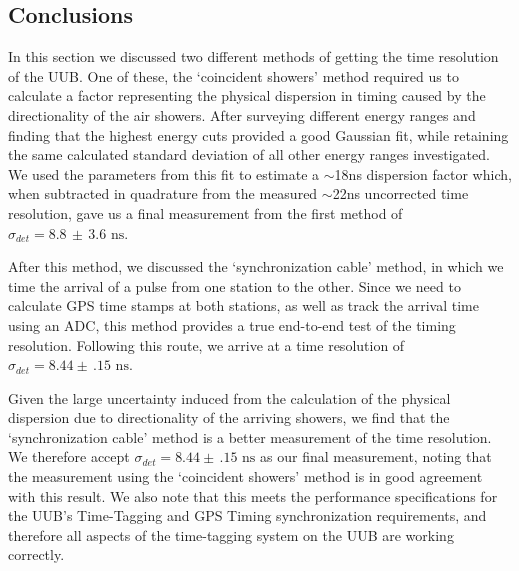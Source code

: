 \subsection{Conclusions}
In this section we discussed two different methods of getting the time resolution of the UUB. One of these, the `coincident showers' method required us to calculate a factor representing the physical dispersion in timing caused by the directionality of the air showers. After surveying different energy ranges and finding that the highest energy cuts provided a good Gaussian fit, while retaining the same calculated standard deviation of all other energy ranges investigated. We used the parameters from this fit to estimate a $\sim$18ns dispersion factor which, when subtracted in quadrature from the measured $\sim$22ns uncorrected time resolution, gave us a final measurement from the first method of $\sigma_{det}=8.8 \,\pm\, 3.6 \mbox{ ns}$. 

After this method, we discussed the `synchronization cable' method, in which we time the arrival of a pulse from one station to the other. Since we need to calculate GPS time stamps at both stations, as well as track the arrival time using an ADC, this method provides a true end-to-end test of the timing resolution. Following this route, we arrive at a time resolution of $\sigma_{det}=8.44\pm\,.15\mbox{ ns}$.

Given the large uncertainty induced from the calculation of the physical dispersion due to directionality of the arriving showers, we find that the `synchronization cable' method is a better measurement of the time resolution. We therefore accept $\sigma_{det}=8.44\pm\,.15\mbox{ ns}$ as our final measurement, noting that the measurement using the `coincident showers' method is in good agreement with this result. We also note that this meets the performance specifications for the UUB's Time-Tagging and GPS Timing synchronization requirements, and therefore all aspects of the time-tagging system on the UUB are working correctly.

























